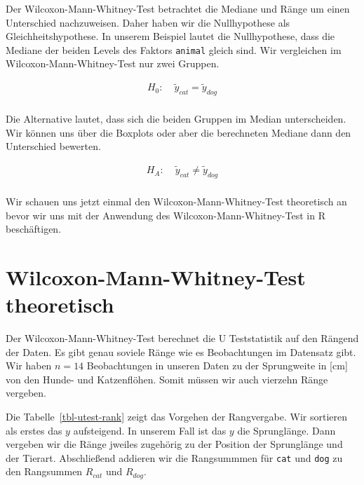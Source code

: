 \documentclass[
  letterpaper,
  DIV=11,
  oneside]{scrreport}
\begin{document}
Der Wilcoxon-Mann-Whitney-Test betrachtet die Mediane und Ränge um einen
Unterschied nachzuweisen. Daher haben wir die Nullhypothese als
Gleichheitshypothese. In unserem Beispiel lautet die Nullhypothese, dass
die Mediane der beiden Levels des Faktors \texttt{animal} gleich sind.
Wir vergleichen im Wilcoxon-Mann-Whitney-Test nur zwei Gruppen.

\begin{align*}
H_0: &\; \widetilde{y}_{cat} = \widetilde{y}_{dog}\\
\end{align*}

Die Alternative lautet, dass sich die beiden Gruppen im Median
unterscheiden. Wir können uns über die Boxplots oder aber die
berechneten Mediane dann den Unterschied bewerten.

\begin{align*}
H_A: &\; \widetilde{y}_{cat} \ne \widetilde{y}_{dog}\\
\end{align*}

Wir schauen uns jetzt einmal den Wilcoxon-Mann-Whitney-Test theoretisch
an bevor wir uns mit der Anwendung des Wilcoxon-Mann-Whitney-Test in R
beschäftigen.

\hypertarget{wilcoxon-mann-whitney-test-theoretisch}{%
\section{Wilcoxon-Mann-Whitney-Test
theoretisch}\label{wilcoxon-mann-whitney-test-theoretisch}}

Der Wilcoxon-Mann-Whitney-Test berechnet die U Teststatistik auf den
Rängend der Daten. Es gibt genau soviele Ränge wie es Beobachtungen im
Datensatz gibt. Wir haben \(n = 14\) Beobachtungen in unseren Daten zu
der Sprungweite in {[}cm{]} von den Hunde- und Katzenflöhen. Somit
müssen wir auch vierzehn Ränge vergeben.

Die Tabelle~\ref{tbl-utest-rank} zeigt das Vorgehen der Rangvergabe. Wir
sortieren als erstes das \(y\) aufsteigend. In unserem Fall ist das
\(y\) die Sprunglänge. Dann vergeben wir die Ränge jweiles zugehörig zu
der Position der Sprunglänge und der Tierart. Abschließend addieren wir
die Rangsummmen für \texttt{cat} und \texttt{dog} zu den Rangsummen
\(R_{cat}\) und \(R_{dog}\).
\end{document}
